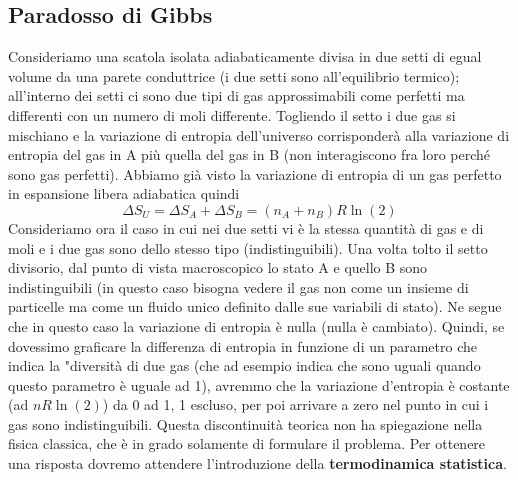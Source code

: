 \documentclass[
10pt, %
a4paper, %
oneside, %
headinclude,footinclude, %
BCOR5mm, %
]{scrartcl}
\begin{document}
\subsection{Paradosso di Gibbs}
Consideriamo una scatola isolata adiabaticamente divisa in due setti di egual volume da una parete conduttrice (i due setti sono all'equilibrio termico); all'interno dei setti ci sono due tipi di gas approssimabili come perfetti ma differenti con un numero di moli differente. Togliendo il setto i due gas si mischiano e la variazione di entropia dell'universo corrisponderà alla variazione di entropia del gas in A più quella del gas in B (non interagiscono fra loro perché sono gas perfetti). Abbiamo già visto la variazione di entropia di un gas perfetto in espansione libera adiabatica quindi
\[\Delta S_U = \Delta S_A + \Delta S_B = (n_A + n_B)R\ln(2)\]
Consideriamo ora il caso in cui nei due setti vi è la stessa quantità di gas e di moli e i due gas sono dello stesso tipo (indistinguibili). Una volta tolto il setto divisorio, dal punto di vista macroscopico lo stato A e quello B sono indistinguibili (in questo caso bisogna vedere il gas non come un insieme di particelle ma come un fluido unico definito dalle sue variabili di stato). Ne segue che in questo caso la variazione di entropia è nulla (nulla è cambiato). Quindi, se dovessimo graficare la differenza di entropia in funzione di un parametro che indica la "diversità di due gas (che ad esempio indica che sono uguali quando questo parametro è uguale ad 1), avremmo che la variazione d'entropia è costante (ad \(nR\ln(2)\)) da 0 ad 1, 1 escluso, per poi arrivare a zero nel punto in cui i gas sono indistinguibili. Questa discontinuità teorica non ha spiegazione nella fisica classica, che è in grado solamente di formulare il problema. Per ottenere una risposta dovremo attendere l'introduzione della \textbf{termodinamica statistica}.
\end{document}
